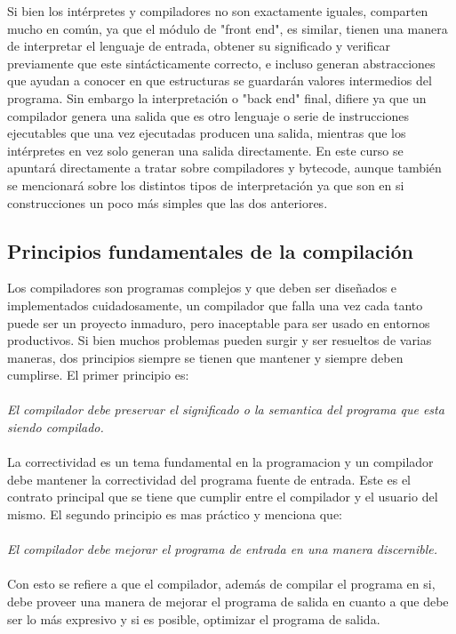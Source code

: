 \documentclass[fleqn]{tcdl}
\begin{document}
Si bien los intérpretes y compiladores no son exactamente iguales, comparten mucho en común, ya que el módulo de "front end", es similar, tienen una manera de interpretar el lenguaje de entrada, obtener su significado y verificar previamente que este sintácticamente correcto, e incluso generan abstracciones que ayudan a conocer en que estructuras se guardarán valores intermedios del programa. Sin embargo la interpretación o "back end" final, difiere ya que un compilador genera una salida que es otro lenguaje o serie de instrucciones ejecutables que una vez ejecutadas producen una salida, mientras que los intérpretes en vez solo generan una salida directamente. En este curso se apuntará directamente a tratar sobre compiladores y bytecode, aunque también se mencionará sobre los distintos tipos de interpretación ya que son en si construcciones un poco más simples que las dos anteriores.

\subsection*{Principios fundamentales de la compilación}

Los compiladores son programas complejos y que deben ser diseñados e implementados cuidadosamente, un compilador que falla una vez cada tanto puede ser un proyecto inmaduro, pero inaceptable para ser usado en entornos productivos. Si bien muchos problemas pueden surgir y ser resueltos de varias maneras, dos principios siempre se tienen que mantener y siempre deben cumplirse. El primer principio es:
\\\\
\textit{El compilador debe preservar el significado o la semantica del programa que esta siendo compilado.}
\\\\
La correctividad es un tema fundamental en la programacion y un compilador debe mantener la correctividad del programa fuente de entrada. Este es el contrato principal que se tiene que cumplir entre el compilador y el usuario del mismo. 
El segundo principio es mas práctico y menciona que:
\\\\
\textit{El compilador debe mejorar el programa de entrada en una manera discernible.}
\\\\
Con esto se refiere a que el compilador, además de compilar el programa en si, debe proveer una manera de mejorar el programa de salida en cuanto a que debe ser lo más expresivo y si es posible, optimizar el programa de salida.
\end{document}
